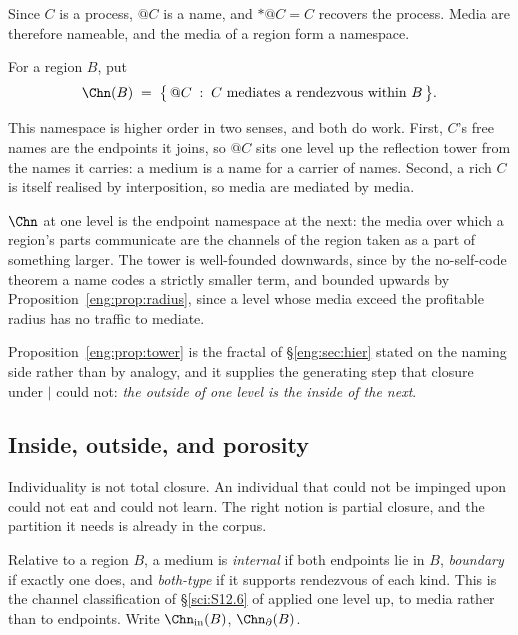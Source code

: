 Since $C$ is a process, $@C$ is a name, and $*@C = C$ recovers the process.
Media are therefore nameable, and the media of a region form a namespace.

\begin{definition}\label{eng:def:med}
For a region $B$, put
\[
  \Chn(B) \;=\; \bigl\{\, @C \;:\; C \text{ mediates a rendezvous
  within } B \,\bigr\}.
\]
\end{definition}

This namespace is higher order in two senses, and both do work. First,
$C$'s free names are the endpoints it joins, so $@C$ sits one level up
the reflection tower from the names it carries: a medium is a name for a
carrier of names. Second, a rich $C$ is itself realised by interposition,
so media are mediated by media.

\begin{proposition}\label{eng:prop:tower}
$\Chn$ at one level is the endpoint namespace at the next: the media over
which a region's parts communicate are the channels of the region taken as
a part of something larger. The tower is well-founded downwards, since by
the no-self-code theorem a name codes a strictly smaller term, and bounded
upwards by Proposition~\ref{eng:prop:radius}, since a level whose media exceed
the profitable radius has no traffic to mediate.
\end{proposition}

Proposition~\ref{eng:prop:tower} is the fractal of \S\ref{eng:sec:hier} stated on
the naming side rather than by analogy, and it supplies the generating step
that closure under $\mid$ could not: \emph{the outside of one level is the
inside of the next}.

\subsection{Inside, outside, and porosity}\label{eng:S5.5}
\label{eng:sec:porous}

Individuality is not total closure. An individual that could not be
impinged upon could not eat and could not learn. The right notion is
partial closure, and the partition it needs is already in the corpus.

\begin{definition}\label{eng:def:three}
Relative to a region $B$, a medium is \emph{internal} if both endpoints lie
in $B$, \emph{boundary} if exactly one does, and \emph{both-type} if it
supports rendezvous of each kind. This is the channel classification of
\S\ref{sci:S12.6} of \chSci applied one level up, to media rather than to
endpoints. Write $\Chn_{\mathrm{in}}(B)$, $\Chn_{\partial}(B)$.
\end{definition}

